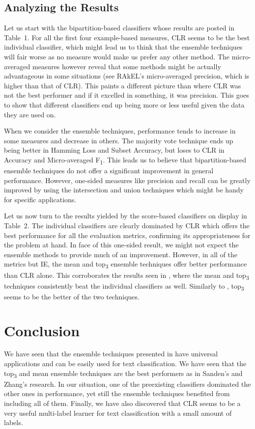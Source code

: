 \subsection*{Analyzing the Results}

Let us start with the bipartition-based classifiers whose results are
posted in Table~1. For all the first four example-based measures, CLR
seems to be the best individual classifier, which might lead us to
think that the ensemble techniques will fair worse as no measure would
make us prefer any other method. The micro-averaged measures however
reveal that some methods might be actually advantageous in some
situations (see RAkEL's micro-averaged precision, which is higher than
that of CLR). This paints a different picture than
\cite{sanden2011enhancing} where CLR was not the best performer and if
it excelled in something, it was precision. This goes to show that
different classifiers end up being more or less useful given the data
they are used on.

When we consider the ensemble techniques, performance tends to
increase in some measures and decrease in others. The majority vote
technique ends up being better in Hamming Loss and Subset Accuracy,
but loses to CLR in Accuracy and Micro-averaged
F\textsubscript{1}. This leads us to believe that bipartition-based
ensemble techniques do not offer a significant improvement in general
performance. However, one-sided measures like precision and recall can
be greatly improved by using the intersection and union techniques
which might be handy for specific applications.

Let us now turn to the results yielded by the score-based classifiers
on display in Table~2. The individual classifiers are clearly
dominated by CLR which offers the best performance for all the
evaluation metrics, confirming its appropriateness for the problem at
hand. In face of this one-sided result, we might not expect the
ensemble methods to provide much of an improvement. However, in all of
the metrics but IE, the mean and top\textsubscript{3} ensemble
techniques offer better performance than CLR alone. This corroborates
the results seen in \cite{sanden2011enhancing}, where the mean and
top\textsubscript{3} techniques consistently beat the individual
classifiers as well. Similarly to \cite{sanden2011enhancing},
top\textsubscript{3} seems to be the better of the two techniques.

\section{Conclusion}
We have seen that the ensemble techniques presented in
\cite{sanden2011enhancing} have universal applications and can be
easily used for text classification. We have seen that the
top\textsubscript{3} and mean ensemble techniques are the best
performers as in Sanden's and Zhang's research. In our situation, one
of the preexisting classifiers dominated the other ones in
performance, yet still the ensemble techniques benefited from
including all of them. Finally, we have also discovered that CLR seems
to be a very useful multi-label learner for text classification with a
small amount of labels.

